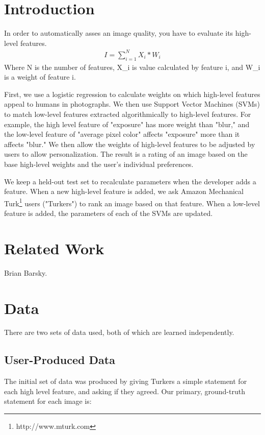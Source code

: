 \documentclass[10pt,twocolumn]{article}
\begin{document}
\section{Introduction}
In order to automatically asses an image quality, you have to 
evaluate its high-level features. %
\begin{eqnarray}
I=\sum_{i=1}^N X_i*W_i
\end{eqnarray}
Where N is the number of features, X_i is value calculated by 
feature i, and W_i is a weight of feature i.

First, we use a logistic regression to calculate weights on which high-level features appeal to humans in photographs. We then use Support Vector Machines (SVMs) to match low-level features extracted algorithmically to high-level features. For example, the high level feature of "exposure" has more weight than "blur," and the low-level feature of "average pixel color" affects "exposure" more than it affects "blur." We then allow the weights of high-level features to be adjusted by users to allow personalization. The result is a rating of an image based on the base high-level weights and the user's individual preferences.

We keep a held-out test set to recalculate parameters when the developer adds a feature. When a new high-level feature is added, we ask Amazon Mechanical Turk\footnote{http://www.mturk.com} users ("Turkers") to rank an image based on that feature. When a low-level feature is added, the parameters of each of the SVMs are updated.

\section{Related Work}
Brian Barsky.

\section{Data}

There are two sets of data used, both of which are learned independently.

\subsection{User-Produced Data}
The initial set of data was produced by giving Turkers a simple statement for each high level feature, and asking if they agreed. Our primary, ground-truth statement for each image is:
\end{document}
